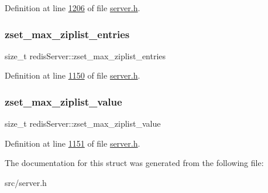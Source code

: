 Definition at line \hyperlink{server_8h_source_l01206}{1206} of file \hyperlink{server_8h_source}{server.\+h}.

\mbox{\label{structredisServer_a01f4e97ee5bcbfe5bee1298fc790047e}} 
\subsubsection{\texorpdfstring{zset\+\_\+max\+\_\+ziplist\+\_\+entries}{zset\_max\_ziplist\_entries}}
{\footnotesize\ttfamily size\+\_\+t redis\+Server\+::zset\+\_\+max\+\_\+ziplist\+\_\+entries}



Definition at line \hyperlink{server_8h_source_l01150}{1150} of file \hyperlink{server_8h_source}{server.\+h}.

\mbox{\label{structredisServer_a194208911c02c2a6b9988ce0b9371e25}} 
\subsubsection{\texorpdfstring{zset\+\_\+max\+\_\+ziplist\+\_\+value}{zset\_max\_ziplist\_value}}
{\footnotesize\ttfamily size\+\_\+t redis\+Server\+::zset\+\_\+max\+\_\+ziplist\+\_\+value}



Definition at line \hyperlink{server_8h_source_l01151}{1151} of file \hyperlink{server_8h_source}{server.\+h}.



The documentation for this struct was generated from the following file\+:\begin{DoxyCompactItemize}
\item 
src/server.\+h\end{DoxyCompactItemize}
